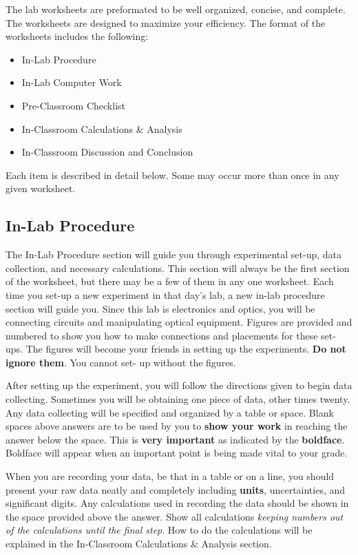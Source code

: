 The lab worksheets are preformated to be well organized, concise, and 
complete.  The worksheets are designed to maximize
your efficiency.  The format of the worksheets includes the following:
\begin{itemize}
\item  In-Lab Procedure \\
\item  In-Lab Computer Work \\
\item  Pre-Classroom Checklist \\
\item  In-Classroom Calculations \& Analysis \\
\item  In-Classroom Discussion  and Conclusion \\
\end{itemize}
Each item is described in detail below.  Some may occur more than once in any 
given worksheet.

\subsection{In-Lab Procedure}

The In-Lab Procedure section will guide you through experimental
set-up, data collection, and necessary calculations.  This section
will always be the first section of the worksheet, but there may be a
few of them in any one worksheet.  Each time you set-up a new
experiment in that day's lab, a new in-lab procedure section will
guide you.  Since this lab is electronics and optics, you will be
connecting circuits and manipulating optical equipment.  Figures are
provided and numbered to show you how to make connections and
placements for these set-ups.  The figures will become your friends in
setting up the experiments.  {\bf Do not ignore them}.  You cannot set-
up without the figures.  
 
After setting up the experiment, you will follow the directions given
to begin data collecting.  Sometimes you will be obtaining one piece
of data, other times twenty.  Any data collecting will be specified
and organized by a table or space.  Blank spaces above answers are to
be used by you to {\bf show your work} in reaching the answer below
the space.  This is {\bf very important} as indicated by the {\bf
boldface}.  Boldface will appear when an important point is being made
vital to your grade.  

When you are recording your data, be that in a table or
on a line, you should present your raw data neatly and completely
including {\bf units}, uncertainties, and significant digits.  Any
calculations used in recording the data should be shown in the space
provided above the answer.  Show all calculations {\it keeping numbers
out of the calculations until the final step}.  How to do the
calculations will be explained in the In-Classroom Calculations \&
Analysis section. 

